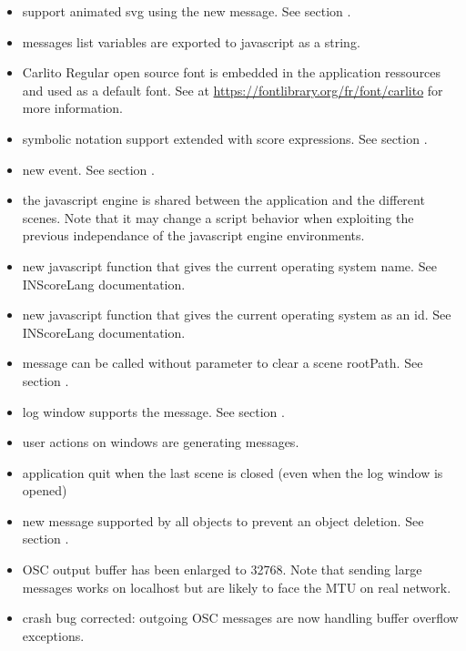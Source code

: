 \begin{itemize}
\item support animated svg using the new  message. See section .
\item messages list variables are exported to javascript as a string.
\item Carlito Regular open source font is embedded in the application ressources and used as a default font. See at \url{https://fontlibrary.org/fr/font/carlito} for more information.
\item symbolic notation support extended with score expressions. See section .
\item new  event. See section .
\item the javascript engine is shared between the application and the different scenes.
  Note that it may change a script behavior when exploiting the previous independance
  of the javascript engine environments.
\item new javascript  function that gives the current operating system name. See INScoreLang documentation.
\item new javascript  function that gives the current operating system as an id. See INScoreLang documentation.
\item {} message can be called without parameter to clear a scene rootPath. See section .
\item log window supports the  message. See section .
\item user actions on windows are generating  messages.
\item application quit when the last scene is closed (even when the log window is opened) 
\item new  message supported by all objects to prevent an object deletion. See section .
\item OSC output buffer has been enlarged to 32768. Note that sending large messages works on localhost but are likely to face the MTU on real network. 
\item crash bug corrected: outgoing OSC messages are now handling buffer overflow exceptions.


\end{itemize}
